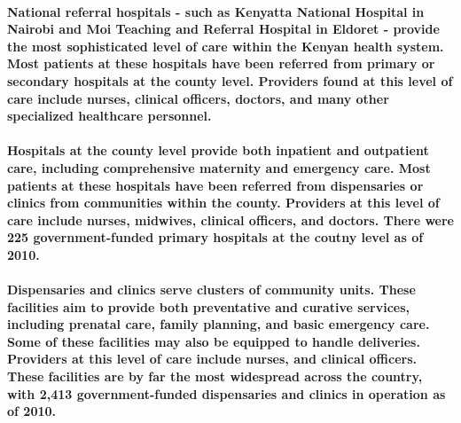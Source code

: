 \paragraph{National referral hospitals - such as Kenyatta National Hospital in Nairobi and Moi Teaching and Referral Hospital in Eldoret -  provide the most sophisticated level of care within the Kenyan health system. Most patients at these hospitals have been referred from primary or secondary hospitals at the county level. Providers found at this level of care include nurses, clinical officers, doctors, and many other specialized healthcare personnel. \citep{SPA2010}}

\paragraph{Hospitals at the county level provide both inpatient and outpatient care, including comprehensive maternity and emergency care. Most patients at these hospitals have been referred from dispensaries or clinics from communities within the county. Providers at this level of care include nurses, midwives, clinical officers, and doctors. There were 225 government-funded primary hospitals at the coutny level as of 2010. \citep{SPA2010}}

\paragraph{Dispensaries and clinics serve clusters of community units. These facilities aim to provide both preventative and curative services, including prenatal care, family planning, and basic emergency care. Some of these facilities may also be equipped to handle deliveries. Providers at this level of care include nurses, and clinical officers.  These facilities are by far the most widespread across the country, with 2,413 government-funded dispensaries and clinics in operation as of 2010. \citep{SPA2010}}

